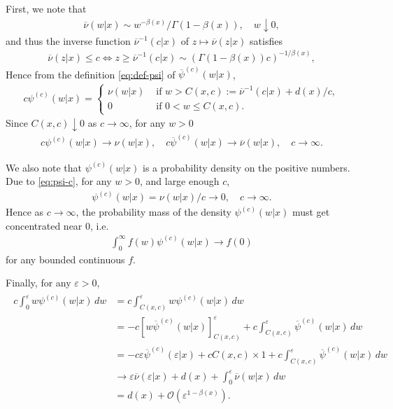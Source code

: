 \documentclass[a4paper,12pt]{article}
\numberwithin{equation}{section}
\theoremstyle{plain}
\theoremstyle{definition}
\theoremstyle{remark}
\numberwithin{equation}{section}
\newcommand{\1}{\mathbf 1}
\begin{document}
First, we note that 
\begin{align}
  \overline \nu(w|x) \sim w^{-\beta(x)} / \Gamma(1-\beta(x)), 
  \quad w \downarrow 0, 
\end{align}
and thus the inverse function ${\overline \nu}^{-1}(c|x)$ of 
$z \mapsto \overline \nu(z|x)$ satisfies
\begin{align}
  \overline \nu(z | x) \le c
  \Leftrightarrow z \ge {\overline \nu}^{-1}(c|x)
  \sim (\Gamma(1-\beta(x))c)^{-1/\beta(x)},
\end{align}
Hence from the definition \eqref{eq:def-psi} of $\overline \psi^{(c)}(w|x)$, 
\begin{align}
\label{eq:psi-c}
  c \psi^{(c)}(w|x) = \begin{cases}
  \nu(w | x) & \text{ if } w > C(x,c) 
  := {\overline \nu}^{-1}(c|x) + d(x)/c, 
  \\
  0 & \text{ if } 0 < w \le C(x,c). 
  \end{cases}
\end{align}
Since $C(x,c) \downarrow 0$ as $c \to \infty$, for any $w > 0$
\begin{align} \label{eq:non-local-psi}
c \psi^{(c)}(w|x) \to \nu(w|x),
\quad 
  c \overline \psi^{(c)}(w|x) \to \overline \nu(w|x), \quad c \to \infty. 
\end{align}

We also note that $\psi^{(c)}(w|x)$ is a probability density on the positive 
numbers.  Due to \eqref{eq:psi-c}, for any $w > 0$, and large enough $c$,
\begin{align}
  \psi^{(c)}(w|x) = \nu(w|x) / c \to 0, \quad c \to \infty. 
\end{align}  
Hence as $c \to \infty$, the probability mass of the density 
$\psi^{(c)}(w|x)$ must get concentrated near $0$, i.e.\ 
\begin{align} \label{eq:to-delta}
  \int_0^\infty f(w) \psi^{(c)}(w|x) \to f(0)
\end{align}
for any bounded continuous $f$.

Finally, for any $\varepsilon > 0$,
\begin{align}
\label{eq:local-psi}
\begin{split}
  c \int_0^\varepsilon w \psi^{(c)}(w|x) \,dw
  &= c \int_{C(x,c)}^\varepsilon w \psi^{(c)}(w|x) \,dw
  \\
  &= -c\left[w\overline \psi^{(c)}(w|x)\right]^\varepsilon_{C(x,c)}
  + c \int_{C(x,c)}^\varepsilon \overline \psi^{(c)}(w|x)\,dw
  \\
  &= -c\varepsilon \overline \psi^{(c)}(\varepsilon|x)
  + c C(x,c) \times 1
  + c \int_{C(x,c)}^\varepsilon \overline \psi^{(c)}(w|x)\,dw
  \\
  &\to \varepsilon \overline\nu(\varepsilon | x)
  + d(x) + \int_0^\varepsilon \overline \nu(w|x)\,dw
  \\
  &= d(x) + \mathcal O(\varepsilon^{1-\beta(x)}).
\end{split}
\end{align}
\end{document}
